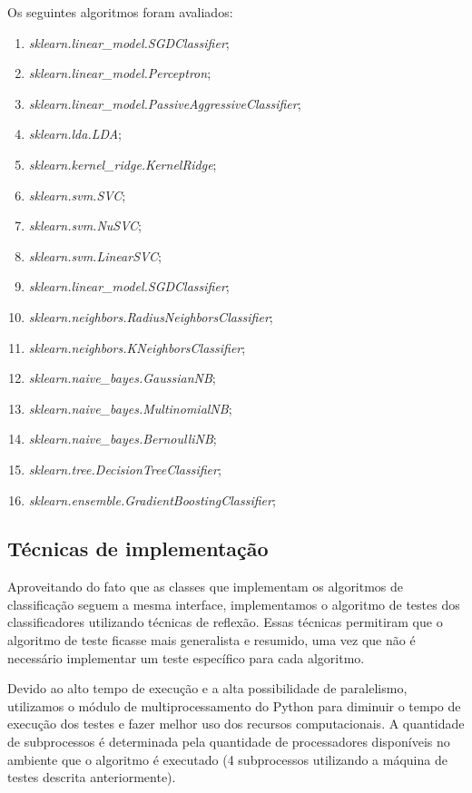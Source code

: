 \documentclass[11pt]{article}
\begin{document}
Os seguintes algoritmos foram avaliados:

\begin{enumerate}
    \item \textit{sklearn.linear\_model.SGDClassifier};
    \item \textit{sklearn.linear\_model.Perceptron};
    \item \textit{sklearn.linear\_model.PassiveAggressiveClassifier};
    \item \textit{sklearn.lda.LDA};
    \item \textit{sklearn.kernel\_ridge.KernelRidge};
    \item \textit{sklearn.svm.SVC};
    \item \textit{sklearn.svm.NuSVC};
    \item \textit{sklearn.svm.LinearSVC};
    \item \textit{sklearn.linear\_model.SGDClassifier};
    \item \textit{sklearn.neighbors.RadiusNeighborsClassifier};
    \item \textit{sklearn.neighbors.KNeighborsClassifier};
    \item \textit{sklearn.naive\_bayes.GaussianNB};
    \item \textit{sklearn.naive\_bayes.MultinomialNB};
    \item \textit{sklearn.naive\_bayes.BernoulliNB};
    \item \textit{sklearn.tree.DecisionTreeClassifier};
    \item \textit{sklearn.ensemble.GradientBoostingClassifier};
\end{enumerate}

\subsection{Técnicas de implementação}

Aproveitando do fato que as classes que implementam os algoritmos de
classificação seguem a mesma interface, implementamos o algoritmo de testes dos
classificadores utilizando técnicas de reflexão. Essas técnicas permitiram que o
algoritmo de teste ficasse mais generalista e resumido, uma vez que não é
necessário implementar um teste específico para cada algoritmo.

Devido ao alto tempo de execução e a alta possibilidade de paralelismo,
utilizamos o módulo de multiprocessamento do Python para diminuir o tempo de
execução dos testes e fazer melhor uso dos recursos computacionais. A
quantidade de subprocessos é determinada pela quantidade de processadores
disponíveis no ambiente que o algoritmo é executado (4 subprocessos utilizando
a máquina de testes descrita anteriormente).
\end{document}
